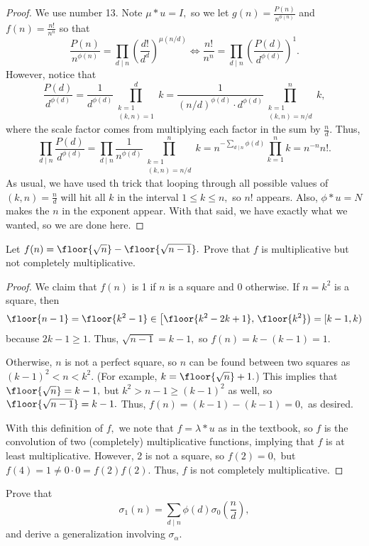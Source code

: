 \begin{proof}
We use number 13. Note $\mu*u=I,$ so we let $g(n)=\frac{P(n)}{n^{\phi(n)}}$ and $f(n)=\frac{n!}{n^n}$ so that
\[\frac{P(n)}{n^{\phi(n)}}=\prod_{d\mid n}\left(\frac{d!}{d^d}\right)^{\mu(n/d)}\iff\frac{n!}{n^n}=\prod_{d\mid n}\left(\frac{P(d)}{d^{\phi(d)}}\right)^1.\]
However, notice that
\[\frac{P(d)}{d^{\phi(d)}}=\frac1{d^{\phi(d)}}\prod_{\substack{k=1\\(k,n)=1}}^dk=\frac1{(n/d)^{\phi(d)}\cdot d^{\phi(d)}}\prod_{\substack{k=1\\(k,n)=n/d}}^nk,\]
where the scale factor comes from multiplying each factor in the sum by $\frac nd.$ Thus,
\[\prod_{d\mid n}\frac{P(d)}{d^{\phi(d)}}=\prod_{d\mid n}\frac1{n^{\phi(d)}}\prod_{\substack{k=1\\(k,n)=n/d}}^nk=n^{-\sum_{d\mid n}\phi(d)}\prod_{k=1}^nk=n^{-n}n!.\]
As usual, we have used th trick that looping through all possible values of $(k,n)=\frac nd$ will hit all $k$ in the interval $1\le k\le n,$ so $n!$ appears. Also, $\phi*u=N$ makes the $n$ in the exponent appear. With that said, we have exactly what we wanted, so we are done here.
\end{proof}

\begin{exercise}
Let $f(n)=\floor{\sqrt n}-\floor{\sqrt{n-1}}.$ Prove that $f$ is multiplicative but not completely multiplicative.
\end{exercise}

\begin{proof}
We claim that $f(n)$ is 1 if $n$ is a square and 0 otherwise. If $n=k^2$ is a square, then
\[\floor{n-1}=\floor{k^2-1}\in\left[\floor{k^2-2k+1},\,\floor{k^2}\right)=[k-1,k)\]
because $2k-1\ge1.$ Thus, $\sqrt{n-1}=k-1,$ so $f(n)=k-(k-1)=1.$

Otherwise, $n$ is not a perfect square, so $n$ can be found between two squares as $(k-1)^2<n<k^2.$ (For example, $k=\floor{\sqrt n}+1.$) This implies that $\floor{\sqrt n}=k-1,$ but $k^2>n-1\ge(k-1)^2$ as well, so $\floor{\sqrt{n-1}}=k-1.$ Thus, $f(n)=(k-1)-(k-1)=0,$ as desired.

With this definition of $f,$ we note that $f=\lambda*u$ as in the textbook, so $f$ is the convolution of two (completely) multiplicative functions, implying that $f$ is at least multiplicative. However, 2 is not a square, so $f(2)=0,$ but $f(4)=1\ne 0\cdot0=f(2)f(2).$ Thus, $f$ is not completely multiplicative.
\end{proof}

\begin{exercise}
Prove that
\[\sigma_1(n)=\sum_{d\mid n}\phi(d)\sigma_0\left(\frac nd\right),\]
and derive a generalization involving $\sigma_\alpha.$
\end{exercise}

